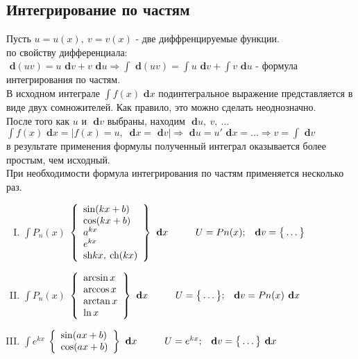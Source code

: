 \documentclass[a4paper,12pt]{bookest}
\theoremstyle{remark}
\newcommand\tab[1][1cm]{\hspace*{#1}}
\newcommand\dx{\textbf{ d}x}
\newcommand\dy{\textbf{ d}}
\begin{document}
\subsection{Интегрирование по частям}
Пусть $u=u(x),\>v=v(x)$ - две диффренцируемые функции. \\
по свойству дифференциала:\\$\dy(uv)=u\dy v+v\dy u\Rightarrow\int \dy (uv)=\int u\dy v+\int v\dy u$ - формула интегрирования по частям.\\
В исходном интеграле $\int f(x)\dx$ подинтегральное выражение представляется в виде двух сомножителей. Как правило, это можно сделать неоднозначно.\\
После того как $u$ и $\dy v$ выбраны, находим $\dy u ,\>v,\>...$\\
$\int f(x)\dx = |f(x)=u,\>\dx=\dy v|\Rightarrow \dy u=u'\dx=...\Rightarrow v=\int \dy v$ \\
в результате применения формулы полученный интеграл оказывается более простым, чем исходный.\\
При необходимости формула интегрирования по частям применяется несколько раз.
\begin{enumerate}[I.]
	\item $\int P_n(x)$
		$\left\{\begin{array}{lr}
        \sin(kx+b)\\ \cos(kx+b)\\a^{kx}\\e^{kx}\\\textrm{sh}kx,\>\textrm{ch}(kx)
        \end{array}\right\}\dx\tab U=Pn(x);\>\>\dy v=\big\{\dots\big\}$
        \item $\int P_n(x)$
		$\left\{\begin{array}{lr}
        \arcsin x\\ \arccos x\\\arctan x\\\ln x\\
        \end{array}\right\}\dx\tab U=\big\{\dots\big\};\>\>\dy v=Pn(x)\dx$
        \item $\int e^{kx}$
		$\left\{\begin{array}{lr}
        \sin (ax+b)\\ \cos (ax+b)\end{array}\right\}\dx\tab U=e^{kx};\>\>\dy v=\big\{\dots\big\}\dx$
\end{enumerate}
\end{document}
